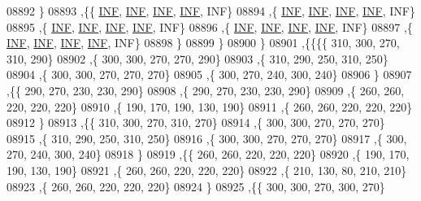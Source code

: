 \begin{DoxyCode}
08892     \}
08893    ,\{\{   \hyperlink{constants_8h_a12c2040f25d8e3a7b9e1c2024c618cb6}{INF},   \hyperlink{constants_8h_a12c2040f25d8e3a7b9e1c2024c618cb6}{INF},   \hyperlink{constants_8h_a12c2040f25d8e3a7b9e1c2024c618cb6}{INF},   \hyperlink{constants_8h_a12c2040f25d8e3a7b9e1c2024c618cb6}{INF},   INF\}
08894     ,\{   \hyperlink{constants_8h_a12c2040f25d8e3a7b9e1c2024c618cb6}{INF},   \hyperlink{constants_8h_a12c2040f25d8e3a7b9e1c2024c618cb6}{INF},   \hyperlink{constants_8h_a12c2040f25d8e3a7b9e1c2024c618cb6}{INF},   \hyperlink{constants_8h_a12c2040f25d8e3a7b9e1c2024c618cb6}{INF},   INF\}
08895     ,\{   \hyperlink{constants_8h_a12c2040f25d8e3a7b9e1c2024c618cb6}{INF},   \hyperlink{constants_8h_a12c2040f25d8e3a7b9e1c2024c618cb6}{INF},   \hyperlink{constants_8h_a12c2040f25d8e3a7b9e1c2024c618cb6}{INF},   \hyperlink{constants_8h_a12c2040f25d8e3a7b9e1c2024c618cb6}{INF},   INF\}
08896     ,\{   \hyperlink{constants_8h_a12c2040f25d8e3a7b9e1c2024c618cb6}{INF},   \hyperlink{constants_8h_a12c2040f25d8e3a7b9e1c2024c618cb6}{INF},   \hyperlink{constants_8h_a12c2040f25d8e3a7b9e1c2024c618cb6}{INF},   \hyperlink{constants_8h_a12c2040f25d8e3a7b9e1c2024c618cb6}{INF},   INF\}
08897     ,\{   \hyperlink{constants_8h_a12c2040f25d8e3a7b9e1c2024c618cb6}{INF},   \hyperlink{constants_8h_a12c2040f25d8e3a7b9e1c2024c618cb6}{INF},   \hyperlink{constants_8h_a12c2040f25d8e3a7b9e1c2024c618cb6}{INF},   \hyperlink{constants_8h_a12c2040f25d8e3a7b9e1c2024c618cb6}{INF},   INF\}
08898     \}
08899    \}
08900   \}
08901  ,\{\{\{\{   310,   300,   270,   310,   290\}
08902     ,\{   300,   300,   270,   270,   290\}
08903     ,\{   310,   290,   250,   310,   250\}
08904     ,\{   300,   300,   270,   270,   270\}
08905     ,\{   300,   270,   240,   300,   240\}
08906     \}
08907    ,\{\{   290,   270,   230,   230,   290\}
08908     ,\{   290,   270,   230,   230,   290\}
08909     ,\{   260,   260,   220,   220,   220\}
08910     ,\{   190,   170,   190,   130,   190\}
08911     ,\{   260,   260,   220,   220,   220\}
08912     \}
08913    ,\{\{   310,   300,   270,   310,   270\}
08914     ,\{   300,   300,   270,   270,   270\}
08915     ,\{   310,   290,   250,   310,   250\}
08916     ,\{   300,   300,   270,   270,   270\}
08917     ,\{   300,   270,   240,   300,   240\}
08918     \}
08919    ,\{\{   260,   260,   220,   220,   220\}
08920     ,\{   190,   170,   190,   130,   190\}
08921     ,\{   260,   260,   220,   220,   220\}
08922     ,\{   210,   130,    80,   210,   210\}
08923     ,\{   260,   260,   220,   220,   220\}
08924     \}
08925    ,\{\{   300,   300,   270,   300,   270\}

\end{DoxyCode}
